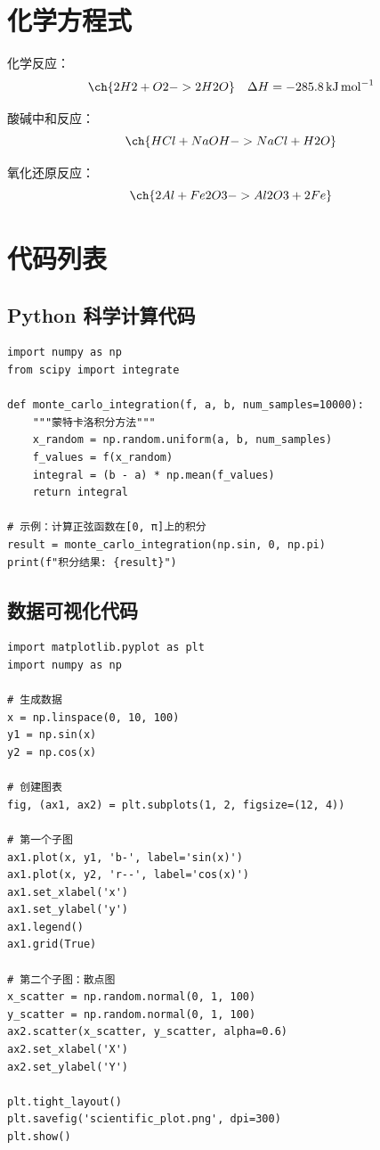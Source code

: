 \section{化学方程式}
\label{sec:chemistry}

化学反应：
\begin{equation}
    \ch{2 H2 + O2 -> 2 H2O} \quad \Delta H = \SI{-285.8}{\kilo\joule\per\mole}
\end{equation}

酸碱中和反应：
\begin{equation}
    \ch{HCl + NaOH -> NaCl + H2O}
\end{equation}

氧化还原反应：
\begin{equation}
    \ch{2 Al + Fe2O3 -> Al2O3 + 2 Fe}
\end{equation}

\section{代码列表}
\label{sec:code}

\subsection{Python 科学计算代码}

\begin{lstlisting}[style=mypython,caption=数值积分计算, label=code:integration]
import numpy as np
from scipy import integrate

def monte_carlo_integration(f, a, b, num_samples=10000):
    """蒙特卡洛积分方法"""
    x_random = np.random.uniform(a, b, num_samples)
    f_values = f(x_random)
    integral = (b - a) * np.mean(f_values)
    return integral

# 示例：计算正弦函数在[0, π]上的积分
result = monte_carlo_integration(np.sin, 0, np.pi)
print(f"积分结果: {result}")
\end{lstlisting}

\subsection{数据可视化代码}

\begin{lstlisting}[style=mypython, caption=科学数据可视化, label=code:visualization]
import matplotlib.pyplot as plt
import numpy as np

# 生成数据
x = np.linspace(0, 10, 100)
y1 = np.sin(x)
y2 = np.cos(x)

# 创建图表
fig, (ax1, ax2) = plt.subplots(1, 2, figsize=(12, 4))

# 第一个子图
ax1.plot(x, y1, 'b-', label='sin(x)')
ax1.plot(x, y2, 'r--', label='cos(x)')
ax1.set_xlabel('x')
ax1.set_ylabel('y')
ax1.legend()
ax1.grid(True)

# 第二个子图：散点图
x_scatter = np.random.normal(0, 1, 100)
y_scatter = np.random.normal(0, 1, 100)
ax2.scatter(x_scatter, y_scatter, alpha=0.6)
ax2.set_xlabel('X')
ax2.set_ylabel('Y')

plt.tight_layout()
plt.savefig('scientific_plot.png', dpi=300)
plt.show()
\end{lstlisting}

